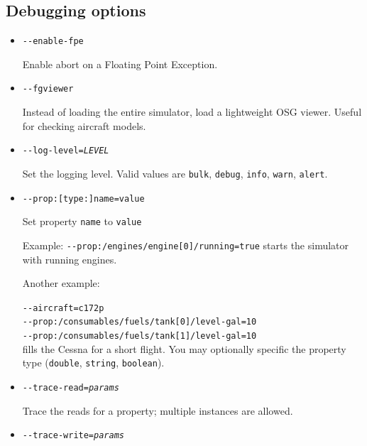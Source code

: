 {\begin{itemize}
\end{itemize}

\subsection{Debugging options}
\begin{itemize}

\item{\texttt{-$ $-enable-fpe}}

Enable abort on a Floating Point Exception. 

\item{\texttt{-$ $-fgviewer}}

Instead of loading the entire simulator, load a lightweight OSG viewer. Useful for checking aircraft
models.

\item{\texttt{-$ $-log-level={\it LEVEL}}}

Set the logging level. Valid values are \texttt{bulk}, \texttt{debug}, \texttt{info}, \texttt{warn}, \texttt{alert}.

\item{\texttt{-$ $-prop:[type:]name=value}}

Set property \texttt{name} to \texttt{value}

Example: \texttt{-$ $-prop:/engines/engine[0]/running=true} starts the simulator with running engines.

Another example:

\texttt{-$ $-aircraft=c172p}\\
\texttt{-$ $-prop:/consumables/fuels/tank[0]/level-gal=10}\\
\texttt{-$ $-prop:/consumables/fuels/tank[1]/level-gal=10}\\

fills the Cessna for a short flight. You may optionally specific
the property type (\texttt{double}, \texttt{string}, \texttt{boolean}).

\item{\texttt{-$ $-trace-read={\it params}}}

Trace the reads for a property; multiple instances are allowed.

\item{\texttt{-$ $-trace-write={\it params}}}


\end{itemize}}
